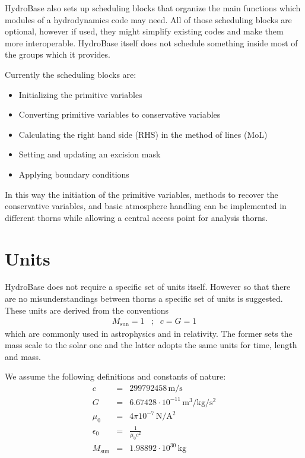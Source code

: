 HydroBase also sets up scheduling blocks that organize the main functions which modules of a 
hydrodynamics code may need. All of those scheduling blocks are optional, however if used,
they might simplify existing codes and make them more interoperable. HydroBase itself does
not schedule something inside most of the groups which it provides.

Currently the scheduling blocks are:
\begin{itemize}
 \item Initializing the primitive variables
 \item Converting primitive variables to conservative variables
 \item Calculating the right hand side (RHS) in the method of lines (MoL)
 \item Setting and updating an excision mask
 \item Applying boundary conditions
\end{itemize}

In this way the initiation of the primitive variables, methods to recover the conservative
variables, and basic atmosphere handling can be implemented in different thorns while allowing
a central access point for analysis thorns.

\section{Units}

HydroBase does not require a specific set of units itself. However 
so that there are no misunderstandings between thorns a specific 
set of units is suggested.  These units are derived from the
conventions
\begin{eqnarray}
  M_{\mathrm{sun}} = 1 &;& c = G = 1
\end{eqnarray}
which are commonly used in astrophysics and in relativity.
The former sets the mass scale to the solar one and the latter
adopts the same units for time, length and mass.

We assume the following definitions and constants of nature:
\begin{eqnarray}
  c             & = & 299792458\, \mathrm{m/s}
  \\
  G             & = & 6.67428\cdot 10^{-11}\, \mathrm{m^3/kg/s^2}
  \\
  \mu_0         & = & 4 \pi 10^{-7}\, \mathrm{N/A^2}
  \\
  \epsilon_0    & = & \frac{1}{\mu_0 c^2}
  \\
  M_{\mathrm{sun}} & = & 1.98892\cdot10^{30}\, \mathrm{kg}
\end{eqnarray}


